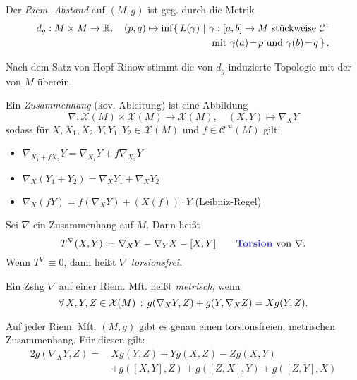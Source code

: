 \documentclass{cheat-sheet}
\newcommand{\abinterval}{\cinterval{a}{b}} %
\newcommand{\Cont}{\mathcal{C}} %
\newcommand{\VF}{\mathcal{X}} %
\begin{document}
\begin{defn}
  Der \emph{Riem. Abstand} auf $(M, g)$ ist geg. durch die Metrik
  \begin{align*}
    d_g : M \times M \to \R, \quad
    (p, q) \mapsto \inf \{\, L(\gamma) \,\,|\,\, & \gamma : \abinterval \to M \text{ stückweise } \Cont^{1}\\
    & \left. \text{mit $\gamma(a) \!=\! p$ und $\gamma(b) \!=\! q$} \, \right\}.
  \end{align*}
\end{defn}

\begin{bem}
  Nach dem Satz von Hopf-Rinow stimmt die von $d_g$ induzierte Topologie mit der von $M$ überein.
\end{bem}


\begin{defn}
  Ein \emph{Zusammenhang} (kov. Ableitung) ist eine Abbildung
  \[
    \nabla : \VF(M) \times \VF(M) \to \VF(M), \quad
    (X, Y) \mapsto \nabla_X Y
  \]
  sodass für $X, X_1, X_2, Y, Y_1, Y_2 \in \VF(M)$ und $f \in \Cont^\infty(M)$ gilt:
  \begin{itemize}
    \item $\nabla_{X_1 + f X_2} Y = \nabla_{X_1} Y + f \nabla_{X_2} Y$
    \item $\nabla_X (Y_1 + Y_2) = \nabla_X Y_1 + \nabla_X Y_2$
    \item $\nabla_X (f Y) = f \left( \nabla_X Y \right) + (X(f)) \cdot Y$ \enspace (Leibniz-Regel)
  \end{itemize}
\end{defn}

\begin{defn}
  Sei $\nabla$ ein Zusammenhang auf $M$. Dann heißt
  \[
    T^\nabla(X, Y) \coloneqq \nabla_X Y - \nabla_Y X - [X, Y]
    \qquad \text{\emph{Torsion} von $\nabla$.}
  \]
  Wenn $T^\nabla \equiv 0$, dann heißt $\nabla$ \emph{torsionsfrei}.
\end{defn}

\begin{defn}
  Ein Zshg $\nabla$ auf einer Riem. Mft. heißt \emph{metrisch}, wenn
  \[ \fa{X, Y, Z \in \VF(M)} g(\nabla_X Y, Z) + g(Y, \nabla_X Z) = X g(Y, Z). \]
\end{defn}

\begin{thm}
  Auf jeder Riem. Mft. $(M, g)$ gibt es genau einen torsionsfreien, metrischen Zusammenhang. Für diesen gilt:
  \begin{align*}
    2 g(\nabla_X Y, Z) = \, & X g(Y, Z) + Y g(X, Z) - Z g(X, Y)\\
    & + g([X, Y], Z) + g([Z, X], Y) + g([Z, Y], X)
  \end{align*}
\end{thm}
\end{document}

